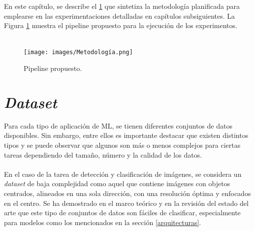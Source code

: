 En este capítulo, se describe el \ref{pipeline} que sintetiza la metodología 
planificada para emplearse en las experimentaciones detalladas en capítulos 
subsiguientes. La Figura \ref{pipeline} muestra el pipeline propuesto 
para la ejecución de los experimentos.  \\\\

\begin{figure}[h!]
\texttt{[image: images/Metodología.png]}
\centering
\caption{Pipeline propuesto.  }
\label{pipeline}
\end{figure}

\section{\textit{Dataset}}

Para cada tipo de aplicación de ML, se tienen diferentes conjuntos de datos 
disponibles. Sin embargo, entre ellos es importante destacar que existen 
distintos tipos y se puede observar que algunos son más o menos 
complejos para ciertas tareas dependiendo del tamaño, número y la 
calidad de los datos.
\\\\
En el caso de la tarea de detección y clasificación de imágenes, 
se considera un \textit{dataset} de baja complejidad como aquel 
que contiene imágenes con objetos centrados, alineados en una sola 
dirección, con una resolución óptima y enfocados en el centro. Se ha 
demostrado en el marco teórico y en la revisión del estado del arte que 
este tipo de conjuntos de datos son fáciles de clasificar, 
especialmente para modelos como los mencionados en la sección \ref{arquitecturas}.
\\\\

